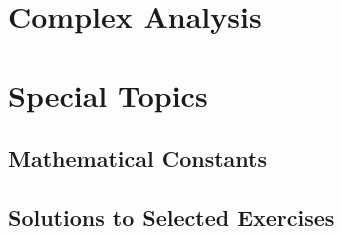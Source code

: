 \documentclass[11pt,a4paper,twoside]{book}
\theoremstyle{eulerstyle}
\theoremstyle{definition}
\begin{document}
\cleardoublepage



\cleardoublepage

\part{Complex Analysis}
\parttoc



\cleardoublepage



\cleardoublepage

\part{Special Topics}
\parttoc



\cleardoublepage



\cleardoublepage



\cleardoublepage



\appendix
\chapter{Mathematical Constants}
\label{app:constants}


\cleardoublepage

\chapter{Solutions to Selected Exercises}
\label{app:solutions}

\end{document}
